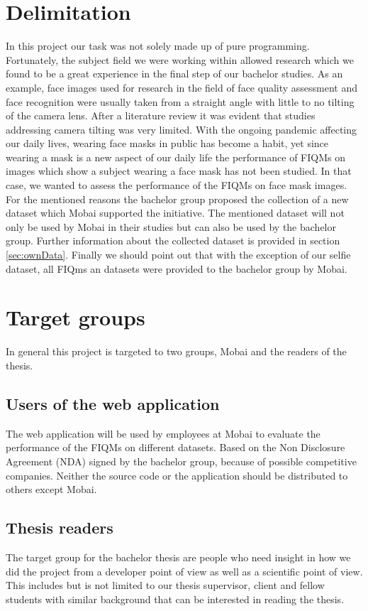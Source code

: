 \section{Delimitation}
\label{sec:delimit}
In this project our task was not solely made up of pure programming. Fortunately, the subject field we were working within allowed research which we found to be a great experience in the final step of our bachelor studies. As an example, face images used for research in the field of face quality assessment and face recognition were usually taken from a straight angle with little to no tilting of the camera lens. After a literature review it was evident that studies addressing camera tilting was very limited. With the ongoing pandemic affecting our daily lives, wearing face masks in public has become a habit, yet since wearing a mask is a new aspect of our daily life the performance of FIQMs on images which show a subject wearing a face mask has not been studied. In that case, we wanted to assess the performance of the FIQMs on face mask images. For the mentioned reasons the bachelor group proposed the collection of a new dataset which Mobai supported the initiative. The mentioned dataset will not only be used by Mobai in their studies but can also be used by the bachelor group. Further information about the collected dataset is provided in section \ref{sec:ownData}. Finally we should point out that with the exception of our selfie dataset, all FIQms an datasets were provided to the bachelor group by Mobai. 

\section{Target groups}
In general this project is targeted to two groups, Mobai and the readers of the thesis. 

\subsection{Users of the web application}
The web application will be used by employees at Mobai to evaluate the performance of the FIQMs on different datasets. Based on the Non Disclosure Agreement (NDA) signed by the bachelor group, because of possible competitive companies. Neither the source code or the application should be distributed to others except Mobai.

\subsection{Thesis readers}
The target group for the bachelor thesis are people who need insight in how we did the project from a developer point of view as well as a scientific point of view. This includes but is not limited to our thesis supervisor,  client and fellow students with similar background that can be interested in reading the thesis.

